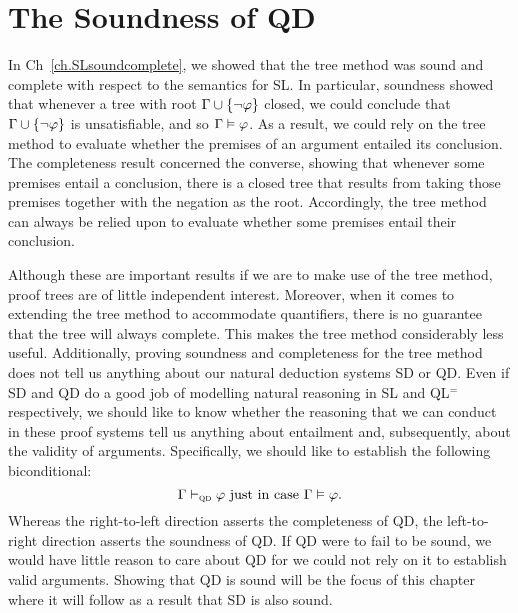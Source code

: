 ﻿%
\chapter{The Soundness of QD}
  \label{ch.FOL-soundness}


In Ch~\ref{ch.SLsoundcomplete}, we showed that the tree method was sound and complete with respect to the semantics for SL.
In particular, soundness showed that whenever a tree with root $\Gamma\cup\lbrace\neg\varphi\rbrace$ closed, we could conclude that $\Gamma\cup\lbrace\neg\varphi\rbrace$ is unsatisfiable, and so $\Gamma \vDash \varphi$.
As a result, we could rely on the tree method to evaluate whether the premises of an argument entailed its conclusion.
The completeness result concerned the converse, showing that whenever some premises entail a conclusion, there is a closed tree that results from taking those premises together with the negation as the root.
Accordingly, the tree method can always be relied upon to evaluate whether some premises entail their conclusion.

Although these are important results if we are to make use of the tree method, proof trees are of little independent interest.
Moreover, when it comes to extending the tree method to accommodate quantifiers, there is no guarantee that the tree will always complete.
This makes the tree method considerably less useful.
Additionally, proving soundness and completeness for the tree method does not tell us anything about our natural deduction systems SD or QD.
Even if SD and QD do a good job of modelling natural reasoning in SL and QL$^=$ respectively, we should like to know whether the reasoning that we can conduct in these proof systems tell us anything about entailment and, subsequently, about the validity of arguments.
Specifically, we should like to establish the following biconditional: 
  $$\Gamma \vdash_{\textsc{qd}} \varphi \text{ just in case } \Gamma \vDash \varphi.$$
Whereas the right-to-left direction asserts the completeness of QD, the left-to-right direction asserts the soundness of QD.
If QD were to fail to be sound, we would have little reason to care about QD for we could not rely on it to establish valid arguments.
Showing that QD is sound will be the focus of this chapter where it will follow as a result that SD is also sound.

